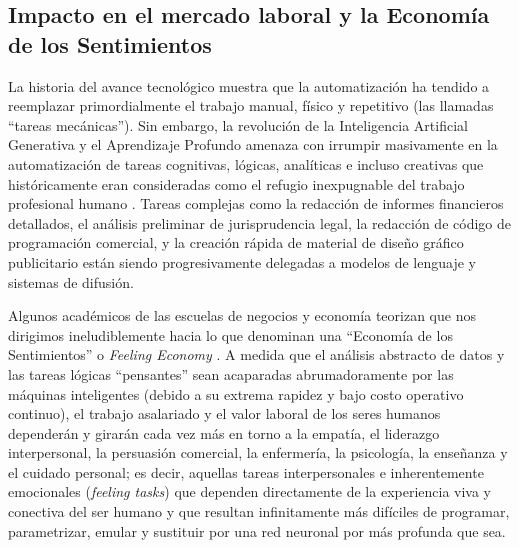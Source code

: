 \documentclass[12pt,letterpaper]{article}
\begin{document}
\subsection{Impacto en el mercado laboral y la Economía de los Sentimientos}
La historia del avance tecnológico muestra que la automatización ha tendido a reemplazar primordialmente el trabajo manual, físico y repetitivo (las llamadas ``tareas mecánicas''). Sin embargo, la revolución de la Inteligencia Artificial Generativa y el Aprendizaje Profundo amenaza con irrumpir masivamente en la automatización de tareas cognitivas, lógicas, analíticas e incluso creativas que históricamente eran consideradas como el refugio inexpugnable del trabajo profesional humano \citep{cappelli2019artificial}. Tareas complejas como la redacción de informes financieros detallados, el análisis preliminar de jurisprudencia legal, la redacción de código de programación comercial, y la creación rápida de material de diseño gráfico publicitario están siendo progresivamente delegadas a modelos de lenguaje y sistemas de difusión.

Algunos académicos de las escuelas de negocios y economía teorizan que nos dirigimos ineludiblemente hacia lo que denominan una ``Economía de los Sentimientos'' o \textit{Feeling Economy} \citep{haenlein2019brief}. A medida que el análisis abstracto de datos y las tareas lógicas ``pensantes'' sean acaparadas abrumadoramente por las máquinas inteligentes (debido a su extrema rapidez y bajo costo operativo continuo), el trabajo asalariado y el valor laboral de los seres humanos dependerán y girarán cada vez más en torno a la empatía, el liderazgo interpersonal, la persuasión comercial, la enfermería, la psicología, la enseñanza y el cuidado personal; es decir, aquellas tareas interpersonales e inherentemente emocionales (\textit{feeling tasks}) que dependen directamente de la experiencia viva y conectiva del ser humano y que resultan infinitamente más difíciles de programar, parametrizar, emular y sustituir por una red neuronal por más profunda que sea.
\end{document}
